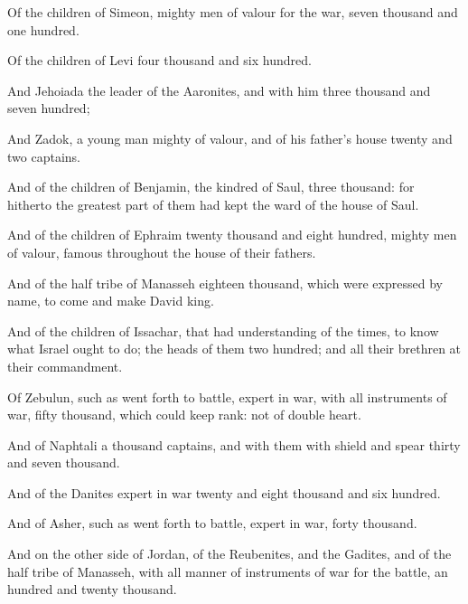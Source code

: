 {Of the
children of
Simeon, mighty
men of
valour for the
war,
seven
thousand and one
hundred.

Of the
children of
Levi
four
thousand and
six
hundred.

And
Jehoiada
{} the
leader of the
Aaronites, and with him
{}
three
thousand and
seven
hundred;

And
Zadok, a young
man
mighty of
valour, and of his
father’s
house
twenty and
two
captains.

And of the
children of
Benjamin, the
kindred of
Saul,
three
thousand: for hitherto the
greatest part of them had
kept the
ward of the
house of
Saul.

And of the
children of
Ephraim
twenty
thousand and
eight
hundred,
mighty
men of
valour,
famous throughout the
house of their
fathers.

And of the
half
tribe of
Manasseh
eighteen
thousand, which were
expressed by
name, to
come and make
David
king.

And of the
children of
Issachar,
{} that had
understanding of the
times, to
know what
Israel ought to
do; the
heads of them
{} two
hundred; and all their
brethren
{} at their
commandment.

Of
Zebulun, such as went
forth to
battle,
expert in
war, with all
instruments of
war,
fifty
thousand, which could keep
rank:
{} not of
double
heart.

And of
Naphtali a
thousand
captains, and with them with
shield and
spear
thirty and
seven
thousand.

And of the
Danites
expert in
war
twenty and
eight
thousand and
six
hundred.

And of
Asher, such as went
forth to
battle,
expert in
war,
forty
thousand.

And on the other
side of
Jordan, of the
Reubenites, and the
Gadites, and of the
half
tribe of
Manasseh, with all manner of
instruments of
war for the
battle, an
hundred and
twenty
thousand.

}
